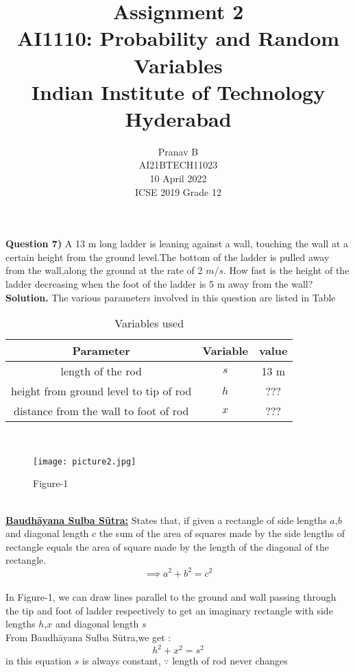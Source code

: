 \documentclass[journal,12pt,twocolumn]{IEEEtran}
\title{Assignment 2 \\ \Large AI1110: Probability and Random Variables \\ \large Indian Institute of Technology Hyderabad}
\author{Pranav B \\ \normalsize AI21BTECH11023 \\ \vspace*{20pt} \normalsize  10 April 2022 \\ \vspace*{20pt} \Large ICSE 2019 Grade 12}
\begin{document}
	\maketitle
	
	\textbf{Question 7)} 
	A 13 m long ladder is leaning against a wall, touching the wall at a certain height from the ground level.The bottom of the ladder is pulled away from the wall,along the ground at the rate of 2 $m/s$. How fast is the height of the ladder decreasing when the foot of the ladder is 5 m away from the wall?\\
	\textbf{Solution.}
	The various parameters involved in this question are listed in Table \begin{table}[h]
\caption{Variables used}
\begin{tabular}{|c|c|c|}
\hline
Parameter & Variable & value\\
\hline
length of the rod & $s$ & 13 m\\
\hline
height from ground level to tip of rod & $h$ & ???\\
\hline
distance from the wall to foot of rod & $x$ &???\\
\hline
\end{tabular}
\end{table}
\\
\begin{figure}[h]
\texttt{[image: picture2.jpg]}
\caption{Figure-1}
\end{figure}
\\
\underline{\textbf{Baudhāyana Sulba Sūtra:}}
States that, if given a rectangle of side lengths $a$,$b$ and diagonal length $c$ the sum of the area of squares made by the side lengths of rectangle equals the area of square made by the length of the diagonal of the rectangle.\\
\begin{equation}
\implies a^2+b^2=c^2
\end{equation}
\\
In Figure-1, we can draw lines parallel to the ground and wall passing through the tip and foot of ladder respectively to get an imaginary rectangle with side lengths $h$,$x$ and diagonal length $s$\\
From Baudhāyana Sulba Sūtra,we get :
\begin{equation}
h^2+x^2=s^2
\end{equation}
in this equation $s$ is always constant,
 $\because$ length of rod never changes\\
\end{document}
